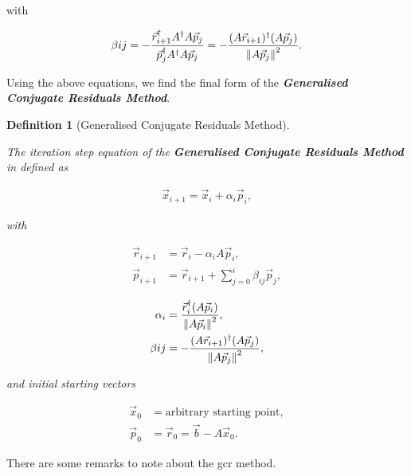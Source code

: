 \documentclass{article}
\theoremstyle{plain} %
\newtheorem{definition}{Definition}[section]
\theoremstyle{convention} %
\theoremstyle{remark} %
\def\df#1{\textbf{\textit{#1}}}
\numberwithin{equation}{section}
\begin{document}
with

\begin{align*}
    \beta{ij} = - \frac{ \vec{r}_{i+1}^{\dagger} A^{\dagger} A \vec{p}_j }{ \vec{p}_j^{\dagger} A^{\dagger} A \vec{p}_j } = - \frac{ (A \vec{r}_{i+1})^{\dagger} (A \vec{p}_j) }{ \norm{A \vec{p}_j}^2 }.
\end{align*}

Using the above equations, we find the final form of the \df{Generalised Conjugate Residuals Method}.

\begin{definition}[Generalised Conjugate Residuals Method]

\label{df:gcr}

The iteration step equation of the \df{Generalised Conjugate Residuals Method} in defined as

\begin{align}
    \vec{x}_{i+1} = \vec{x}_i + \alpha_i \vec{p}_i, \label{eq:gcr:step}
\end{align}

with

\noindent\begin{minipage}{.5\linewidth}
    \begin{align*}
        \vec{r}_{i+1} &= \vec{r}_{i}   - \alpha_i A  \vec{p}_i, \\
        \vec{p}_{i+1} &= \vec{r}_{i+1} + \sum_{j=0}^{i} \beta_{ij} \vec{p}_j, 
    \end{align*}
\end{minipage}
\begin{minipage}{.5\linewidth}
    \begin{align}
        \alpha_i  &=   \frac{ \vec{r}_i^{\dagger} (A \vec{p}_{i}) }{ \norm{A \vec{p}_i}^2 }, \label{eq:gcr:alpha} \\
        \beta{ij} &= - \frac{ (A \vec{r}_{i+1})^{\dagger} (A \vec{p}_j) }{ \norm{A \vec{p}_j}^2 },
    \end{align}
\end{minipage}

and initial starting vectors

\begin{align*}
    \vec{x}_{0} &= \text{arbitrary starting point}, \\
    \vec{p}_{0} &= \vec{r}_{0} = \vec{b} - A \vec{x}_0.
\end{align*}

\end{definition}

There are some remarks to note about the \acrshort{gcr} method.
\end{document}

